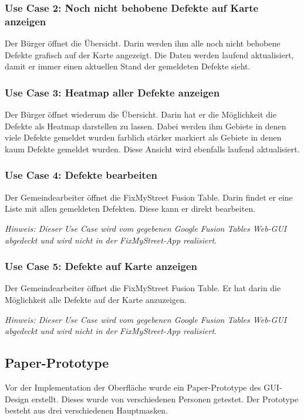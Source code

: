 \subsubsection{Use Case 2: Noch nicht behobene Defekte auf Karte anzeigen}
Der Bürger öffnet die Übersicht. Darin werden ihm alle noch nicht behobene Defekte grafisch auf der Karte angezeigt. Die Daten werden laufend aktualisiert, damit er immer einen aktuellen Stand der gemeldeten Defekte sieht.

\subsubsection{Use Case 3: Heatmap aller Defekte anzeigen}
Der Bürger öffnet wiederum die Übersicht. Darin hat er die Möglichkeit die Defekte als Heatmap darstellen zu lassen. Dabei werden ihm Gebiete in denen viele Defekte gemeldet wurden farblich stärker markiert als Gebiete in denen kaum Defekte gemeldet wurden. Diese Ansicht wird ebenfalls laufend aktualisiert. 

\subsubsection{Use Case 4: Defekte bearbeiten}
Der Gemeindearbeiter öffnet die FixMyStreet Fusion Table. Darin findet er eine Liste mit allen gemeldeten Defekten. Diese kann er direkt bearbeiten.

\emph{Hinweis: Dieser Use Case wird vom gegebenen Google Fusion Tables Web-GUI abgedeckt und wird nicht in der FixMyStreet-App realisiert.}

\subsubsection{Use Case 5: Defekte auf Karte anzeigen}
Der Gemeindearbeiter öffnet die FixMyStreet Fusion Table. Er hat darin die Möglichkeit alle Defekte auf der Karte anzuzeigen.

\emph{Hinweis: Dieser Use Case wird vom gegebenen Google Fusion Tables Web-GUI abgedeckt und wird nicht in der FixMyStreet-App realisiert.}

\subsection{Paper-Prototype}
Vor der Implementation der Oberfläche wurde ein Paper-Prototype des GUI-Design erstellt. Dieses wurde von verschiedenen Personen getestet. Der Prototype besteht aus drei verschiedenen Hauptmasken.

